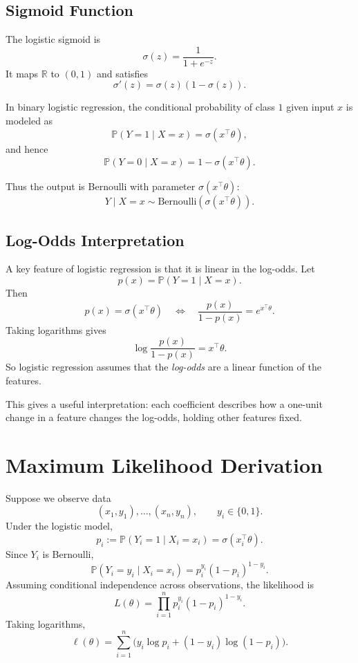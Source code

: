 \subsection{Sigmoid Function}

The logistic sigmoid is
\[
\sigma(z)=\frac{1}{1+e^{-z}}.
\]
It maps $\mathbb R$ to $(0,1)$ and satisfies
\[
\sigma'(z)=\sigma(z)(1-\sigma(z)).
\]

\begin{definition}
In binary logistic regression, the conditional probability of class $1$ given input $x$ is modeled as
\[
\mathbb P(Y=1\mid X=x)=\sigma(x^\top\theta),
\]
and hence
\[
\mathbb P(Y=0\mid X=x)=1-\sigma(x^\top\theta).
\]
\end{definition}

Thus the output is Bernoulli with parameter $\sigma(x^\top\theta)$:
\[
Y\mid X=x \sim \mathrm{Bernoulli}(\sigma(x^\top\theta)).
\]

\subsection{Log-Odds Interpretation}

A key feature of logistic regression is that it is linear in the log-odds. Let
\[
p(x)=\mathbb P(Y=1\mid X=x).
\]
Then
\[
p(x)=\sigma(x^\top\theta)
\quad\Longleftrightarrow\quad
\frac{p(x)}{1-p(x)}=e^{x^\top\theta}.
\]
Taking logarithms gives
\[
\log \frac{p(x)}{1-p(x)} = x^\top\theta.
\]
So logistic regression assumes that the \emph{log-odds} are a linear function of the features.

This gives a useful interpretation: each coefficient describes how a one-unit change in a feature changes the log-odds, holding other features fixed.

\section{Maximum Likelihood Derivation}

Suppose we observe data
\[
(x_1,y_1),\dots,(x_n,y_n),
\qquad y_i\in\{0,1\}.
\]
Under the logistic model,
\[
p_i:=\mathbb P(Y_i=1\mid X_i=x_i)=\sigma(x_i^\top\theta).
\]
Since $Y_i$ is Bernoulli,
\[
\mathbb P(Y_i=y_i\mid X_i=x_i)=p_i^{y_i}(1-p_i)^{1-y_i}.
\]
Assuming conditional independence across observations, the likelihood is
\[
L(\theta)=\prod_{i=1}^n p_i^{y_i}(1-p_i)^{1-y_i}.
\]
Taking logarithms,
\[
\ell(\theta)
=
\sum_{i=1}^n \Big(y_i\log p_i+(1-y_i)\log(1-p_i)\Big).
\]

